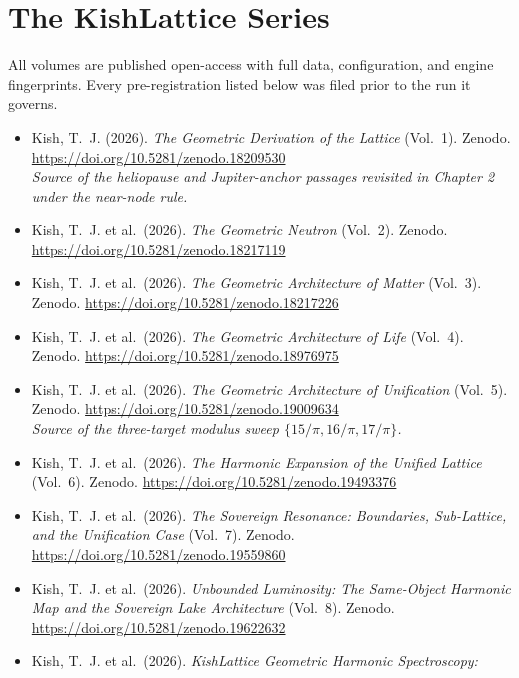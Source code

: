\documentclass[11pt, letterpaper, openany]{book}
\begin{document}
\section*{The KishLattice Series}

All volumes are published open-access with full data, configuration, and engine
fingerprints. Every pre-registration listed below was filed prior to the run it governs.

\begin{itemize}
    \item Kish, T.~J. (2026). \textit{The Geometric Derivation of the Lattice} (Vol.~1).
          Zenodo. \url{https://doi.org/10.5281/zenodo.18209530}
          \\ \textit{Source of the heliopause and Jupiter-anchor passages revisited in
          Chapter 2 under the near-node rule.}
    \item Kish, T.~J. et al.\ (2026). \textit{The Geometric Neutron} (Vol.~2).
          Zenodo. \url{https://doi.org/10.5281/zenodo.18217119}
    \item Kish, T.~J. et al.\ (2026). \textit{The Geometric Architecture of Matter} (Vol.~3).
          Zenodo. \url{https://doi.org/10.5281/zenodo.18217226}
    \item Kish, T.~J. et al.\ (2026). \textit{The Geometric Architecture of Life} (Vol.~4).
          Zenodo. \url{https://doi.org/10.5281/zenodo.18976975}
    \item Kish, T.~J. et al.\ (2026). \textit{The Geometric Architecture of Unification}
          (Vol.~5). Zenodo. \url{https://doi.org/10.5281/zenodo.19009634}
          \\ \textit{Source of the three-target modulus sweep $\{15/\pi, 16/\pi, 17/\pi\}$.}
    \item Kish, T.~J. et al.\ (2026). \textit{The Harmonic Expansion of the Unified Lattice}
          (Vol.~6). Zenodo. \url{https://doi.org/10.5281/zenodo.19493376}
    \item Kish, T.~J. et al.\ (2026). \textit{The Sovereign Resonance: Boundaries,
          Sub-Lattice, and the Unification Case} (Vol.~7).
          Zenodo. \url{https://doi.org/10.5281/zenodo.19559860}
    \item Kish, T.~J. et al.\ (2026). \textit{Unbounded Luminosity: The Same-Object Harmonic
          Map and the Sovereign Lake Architecture} (Vol.~8).
          Zenodo. \url{https://doi.org/10.5281/zenodo.19622632}
    \item Kish, T.~J. et al.\ (2026). \textit{KishLattice Geometric Harmonic Spectroscopy:
}
\end{itemize}
\end{document}
